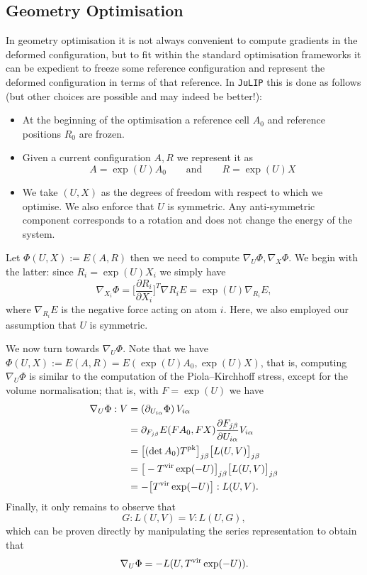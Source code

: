 \documentclass[11pt,a4paper]{amsart}
\begin{document}
\subsection*{Geometry Optimisation}
%
In geometry optimisation it is not always convenient to compute gradients in the
deformed configuration, but to fit within the standard optimisation frameworks
it can be expedient to freeze some reference configuration and represent the
deformed configuration in terms of that reference. In {\tt JuLIP} this is done
as follows (but other choices are possible and may indeed be better!):
%
\begin{itemize}
   \item At the beginning of the optimisation a reference cell $A_0$ and reference positions $R_0$ are frozen.
   \item Given a current configuration $A, R$ we represent it
   as
   \[
      A = \exp(U) A_0 \qquad \text{and} \qquad
      R = \exp(U) X
   \]
   \item We take $(U, X)$ as the degrees of freedom with respect to which we
   optimise. We also enforce that $U$ is symmetric. Any anti-symmetric component
   corresponds to a rotation and does not change the energy of the system.
\end{itemize}
%
Let $\Phi(U, X) := E(A, R)$ then we need to compute $\nabla_U \Phi, \nabla_X
\Phi$. We begin with the latter: since $R_i = \exp(U) X_i$ we simply have
\[
   \nabla_{X_i} \Phi = \bigg[\frac{\partial R_i}{\partial X_i}\bigg]^T \nabla{R_i} E
      = \exp(U) \nabla_{R_i} E,
\]
where $\nabla_{R_i} E$ is the negative force acting on atom $i$. Here, we also
employed our assumption that $U$ is symmetric.

We now turn towards $\nabla_{U} \Phi$. Note that we have $\Phi(U, X) := E(A, R)
= E(\exp(U) A_0, \exp(U) X)$, that is, computing $\nabla_U \Phi$ is similar to
the computation of the Piola--Kirchhoff stress, except for the volume
normalisation; that is, with $F = \exp(U)$ we have
\begin{align*}
   \nabla_U \Phi : V
   &=
   (\partial_{U_{i\alpha}} \Phi)\, V_{i\alpha} \\
   &=
   \partial_{F_{j\beta}} E(F A_0, F X)
   \frac{\partial F_{j\beta}}{\partial U_{i\alpha}} V_{i\alpha} \\
   &=
   \big[ (\det A_0) T^{\rm pk} \big]_{j\beta} \big[L(U, V)\big]_{j\beta} \\
   &=
   \big[ - T^{\rm vir} \exp(-U) \big]_{j\beta} \big[L(U, V)\big]_{j\beta} \\
   &=
   - \big[ T^{\rm vir} \exp(-U) \big] : L(U, V).
\end{align*}
Finally, it only remains to observe that
\[
   G : L(U, V) = V : L(U, G),
\]
which can be proven directly by manipulating the series representation to obtain
that
\begin{equation} \label{eq:grad_U}
   \nabla_U \Phi = - L(U, T^{\rm vir} \exp(-U)).
\end{equation}
\end{document}
